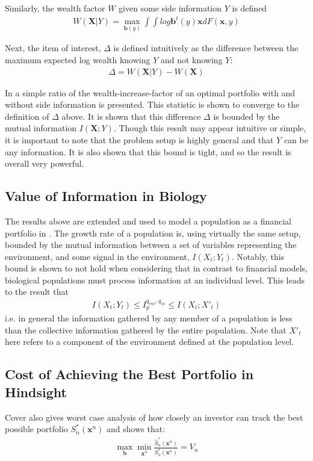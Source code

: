 \documentclass[10pt, twocolumn]{IEEEtran}
\begin{document}
Similarly, the wealth factor $W$ given some side information $Y$ is defined
\begin{gather*}
  W(\boldsymbol{X} | Y) =
  \max_{\boldsymbol{b}(y)}\int\int{log \boldsymbol{b}^{t}(y)\boldsymbol{x} dF(\boldsymbol{x}, y)}
\end{gather*}

Next, the item of interest, $\Delta$ is defined intuitively as the difference
between the maximum expected log wealth knowing $Y$ and not knowing $Y$:
\begin{gather*}
  \Delta = W(\boldsymbol{X} | Y) - W(\boldsymbol{X})
\end{gather*}

In \cite{Cover2005} a simple ratio of the wealth-increase-factor of an optimal portfolio with and without
side information is presented. This statistic is shown to converge to the definition of $\Delta$ above.
It is shown that this difference $\Delta$ is bounded by the mutual information $I(\boldsymbol{X};Y)$. Though this
result may appear intuitive or simple, it is important to note that the problem setup is highly general and
that $Y$ can be any information. It is also shown that this bound is tight, and so the result is overall
very powerful.

\subsection{Value of Information in Biology}
The results above are extended and used to model a population as a financial portfolio in \cite{Rivoire2011}.
The growth rate of a population is, using virtually the same setup, bounded by the mutual information between
a set of variables representing the environment, and some signal in the environment,  $I(X_{t};Y_{t})$.
Notably, this bound is shown to not hold when considering that in contrast to financial models, biological populations
must process information at an individual level. This leads to the result that
\begin{gather*}
  I(X_{t};Y_{t}) \le I_{p}^{q_{env},q_{in}} \le I(X_{t};X'_{t})
\end{gather*}
i.e. in general the information gathered by any member of a population is less than the collective information
gathered by the entire population. Note that $X'_{t}$ here refers to a component of the environment defined at the population level.

\subsection{Cost of Achieving the Best Portfolio in Hindsight}
Cover \cite{Cover1998} also gives worst case analysis of how closely an investor can track the best possible
portfolio $S_{n}^{*}(\boldsymbol{x}^{n})$ and shows that:
\begin{gather*}
  \max_{\boldsymbol{b}}\min_{\boldsymbol{x}^{n}}
  \frac{\hat{S}_{n}^{*}(\boldsymbol{x}^{n})}{S_{n}^{*}(\boldsymbol{x}^{n})}
  = V_{n}
\end{gather*}
\end{document}
